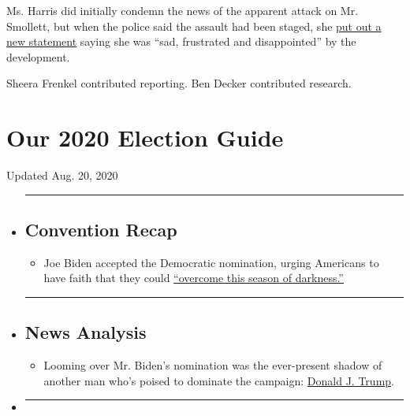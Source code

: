 Ms. Harris did initially condemn the news of the apparent attack on Mr.
Smollett, but when the police said the assault had been staged, she
\href{https://www.nytimes3xbfgragh.onion/2019/02/22/us/politics/jussie-smollett-kamala-harris.html}{put
out a new statement} saying she was ``sad, frustrated and disappointed''
by the development.

Sheera Frenkel contributed reporting. Ben Decker contributed research.

\hypertarget{our-2020-election-guide}{%
\section{Our 2020 Election Guide}\label{our-2020-election-guide}}

Updated Aug. 20, 2020

\begin{itemize}
\item
  \begin{center}\rule{0.5\linewidth}{\linethickness}\end{center}

  \hypertarget{convention-recap}{%
  \subsection{Convention Recap}\label{convention-recap}}

  \begin{itemize}
  \tightlist
  \item
    Joe Biden accepted the Democratic nomination, urging Americans to
    have faith that they could
    \href{https://www.nytimes3xbfgragh.onion/2020/08/20/us/politics/Joe-Biden-accepts-democratic-nomination.html?action=click\&pgtype=Article\&state=default\&region=BELOW_MAIN_CONTENT\&context=storylines_guide}{``overcome
    this season of darkness.''}
  \end{itemize}
\item
  \begin{center}\rule{0.5\linewidth}{\linethickness}\end{center}

  \hypertarget{news-analysis}{%
  \subsection{News Analysis}\label{news-analysis}}

  \begin{itemize}
  \tightlist
  \item
    Looming over Mr. Biden's nomination was the ever-present shadow of
    another man who's poised to dominate the campaign:
    \href{https://www.nytimes3xbfgragh.onion/2020/08/20/us/politics/biden-dnc-speech-trump.html?action=click\&pgtype=Article\&state=default\&region=BELOW_MAIN_CONTENT\&context=storylines_guide}{Donald
    J. Trump}.
  \end{itemize}
\item
  \begin{center}\rule{0.5\linewidth}{\linethickness}\end{center}


\end{itemize}
